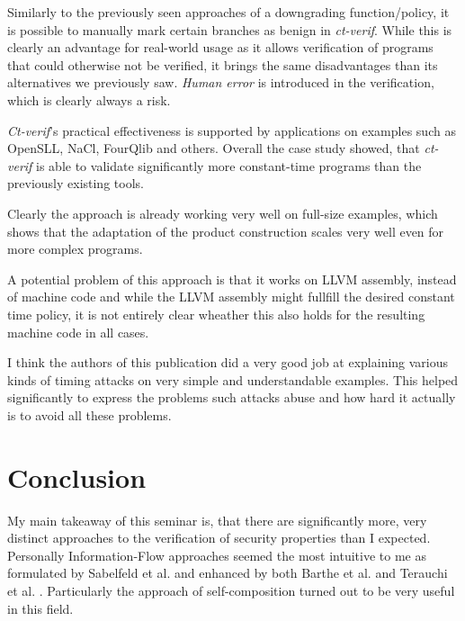 \documentclass[a4paper,UKenglish]{lipics-v2018}
\begin{document}
Similarly to the previously seen approaches of a downgrading function/policy, it is possible to manually mark certain branches as benign in \textit{ct-verif}. While this is clearly an advantage for real-world usage as it allows verification of programs that could otherwise not be verified, it brings the same disadvantages than its alternatives we previously saw. \textit{Human error} is introduced in the verification, which is clearly always a risk.

\textit{Ct-verif}'s practical effectiveness is supported by applications on examples such as OpenSLL, NaCl, FourQlib and others. Overall the case study showed, that \textit{ct-verif} is able to validate significantly more constant-time programs than the previously existing tools.
\cite{verifying_constant_time_implementations}

Clearly the approach is already working very well on full-size examples, which shows that the adaptation of the product construction scales very well even for more complex programs.
\cite{verifying_constant_time_implementations}

A potential problem of this approach is that it works on LLVM assembly, instead of machine code and while the LLVM assembly might fullfill the desired constant time policy, it is not entirely clear wheather this also holds for the resulting machine code in all cases.\cite{verifying_constant_time_implementations}

I think the authors of this publication did a very good job at explaining various kinds of timing attacks on very simple and understandable examples. This helped significantly to express the problems such attacks abuse and how hard it actually is to avoid all these problems.



\section{Conclusion}

My main takeaway of this seminar is, that there are significantly more, very distinct approaches to the verification of security properties than I expected. Personally Information-Flow approaches seemed the most intuitive to me as formulated by Sabelfeld et al.\cite{language_based_information_flow_security} and enhanced by both Barthe et al.\cite{information_flow_by_self_composition} and Terauchi et al. \cite{secure_information_flow_safety}. Particularly the approach of self-composition turned out to be very useful in this field.
\end{document}
